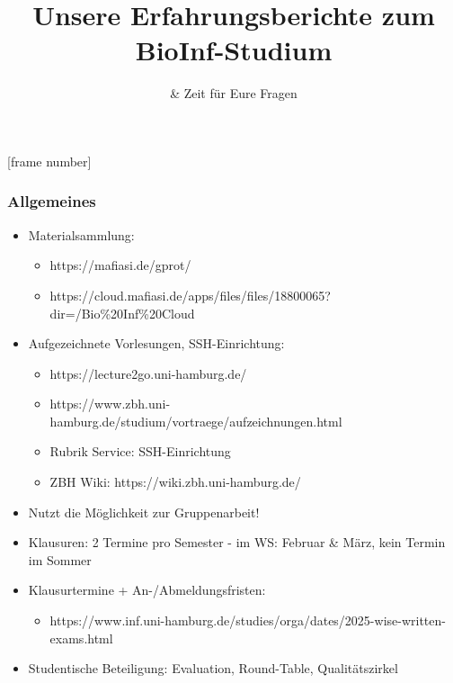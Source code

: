 \title{Unsere Erfahrungsberichte zum BioInf-Studium}
\subtitle{\& Zeit für Eure Fragen}

\date{} %
[frame number]


\begin{frame}
	\maketitle
    
\end{frame}





\begin{frame}
    \frametitle{Allgemeines}
    \logos
    \begin{itemize}
        \item Materialsammlung: 
        \begin{itemize}
            \item https://mafiasi.de/gprot/
            \item https://cloud.mafiasi.de/apps/files/files/18800065?dir=/Bio\%20Inf\%20Cloud
        \end{itemize}
        \item Aufgezeichnete Vorlesungen, SSH-Einrichtung:
        \begin{itemize}
            \item https://lecture2go.uni-hamburg.de/
            \item https://www.zbh.uni-hamburg.de/studium/vortraege/aufzeichnungen.html
            \item Rubrik Service: SSH-Einrichtung
            \item ZBH Wiki: https://wiki.zbh.uni-hamburg.de/
        \end{itemize}
                \item Nutzt die Möglichkeit zur Gruppenarbeit!
        \item Klausuren: 2 Termine pro Semester - im WS: Februar \& März, kein Termin im Sommer
        \item Klausurtermine + An-/Abmeldungsfristen: \\
        \begin{itemize}
            \item https://www.inf.uni-hamburg.de/studies/orga/dates/2025-wise-written-exams.html
        \end{itemize}
        \item Studentische Beteiligung: Evaluation, Round-Table, Qualitätszirkel
    \end{itemize}
\end{frame}


